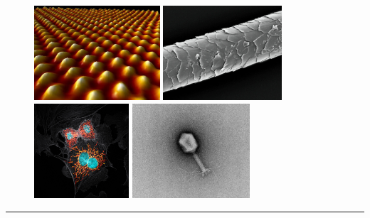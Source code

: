 \documentclass[12pt,a4paper]{article}
\begin{document}
\begin{figure}[!h]
\includegraphics[height=100pt]{images/atoms.jpg}
\hfill
\includegraphics[height=100pt]{images/hair.jpg}
\hfill
\includegraphics[height=100pt]{images/bpae_cell_mitosis.jpg}
\hfill
\includegraphics[height=100pt]{images/virus.jpg}
\end{figure}

\hrule{}
\end{document}
